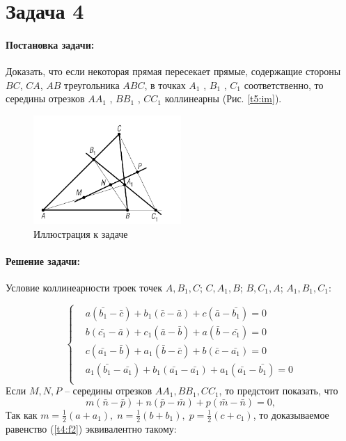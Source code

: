 {
   \section*{Задача 4}
   \paragraph{Постановка задачи:}
   Доказать, что если некоторая прямая пересекает прямые, содержащие стороны
   \(BC\), \(CA\), \(AB\) треугольника \(ABC\), в точках \(A_1\) , \(B_1\) , \(C_1\)
   соответственно, то середины отрезков \(AA_1\) , \(BB_1\) , \(CC_1\) коллинеарны (Рис. \ref{t5:im}).
   \begin{figure}[h]
      \centering
      \includegraphics[width=0.5\textwidth]{images/task4.png}
      \caption{Иллюстрация к задаче}
      \label{t4:im}
   \end{figure}
   \paragraph{Решение задачи:}
   Условие коллинеарности троек точек \(A, B_1 , C\); \(C,
   A_1 , B\); \(B, C_1 , A\); \(A_1 , B_1 , C_1\):

   \begin{equation}
      \left\{ \begin{aligned}
          & a(\bar{b_1} - \bar{c}) + b_1(\bar{c} - \bar{a}) + c(\bar{a} - \bar{b_1}) = 0             \\
          & b(\bar{c_1} - \bar{a}) + c_1(\bar{a} - \bar{b}) + a(\bar{b} - \bar{c_1}) = 0             \\
          & c(\bar{a_1} - \bar{b}) + a_1(\bar{b} - \bar{c}) + b(\bar{c} - \bar{a_1}) = 0             \\
          & a_1(\bar{b_1} - \bar{a_1}) + b_1(\bar{a_1} - \bar{a_1}) + a_1(\bar{a_1} - \bar{b_1}) = 0 \\
      \end{aligned}
      \right. \label{t4:f1}
   \end{equation}
   Если \(M, N, P\) -- середины отрезков \(AA_1, BB_1, CC_1\), то предстоит показать, что
   \begin{equation}
      m(\bar{n} -\bar{p})+n(\bar{p}-\bar{m})+p(\bar{m}-\bar{n})=0,
      \label{t4:f2}
   \end{equation}
   Так как \(\displaystyle
   m=\frac{1}{2}(a+a_1),\;
   n=\frac{1}{2}(b+b_1),\;
   p=\frac{1}{2}(c+c_1)
   \), то доказываемое равенство (\ref{t4:f2}) эквивалентно такому:

}
